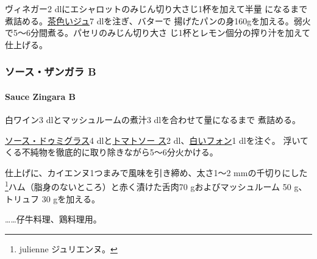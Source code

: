 ヴィネガー2\undemi{} dlにエシャロットのみじん切り大さじ1杯を加えて半量
になるまで煮詰める。\protect\hyperlink{jus-de-veau-lie}{茶色いジュ}7
dlを注ぎ、バターで
揚げたパンの身160gを加える。弱火で5〜6分間煮る。パセリのみじん切り大さ
じ1杯とレモン\undemi{}個分の搾り汁を加えて仕上げる。

\maeaki

\hypertarget{ux30bdux30fcux30b9ux30b6ux30f3ux30acux30e9-b}{%
\subsubsection{ソース・ザンガラ
B}\label{ux30bdux30fcux30b9ux30b6ux30f3ux30acux30e9-b}}

\hypertarget{sauce-zingara-b}{%
\paragraph{Sauce Zingara B}\label{sauce-zingara-b}}

白ワイン3 dlとマッシュルームの煮汁3 dlを合わせて\untiers{}量になるまで
煮詰める。

\protect\hyperlink{sauce-demi-glace}{ソース・ドゥミグラス}4
dlと\protect\hyperlink{sauce-tomate}{トマトソー ス}2\undemi{}
dl、\protect\hyperlink{fonds-blanc}{白いフォン}1 dlを注ぐ。
浮いてくる不純物を徹底的に取り除きながら5〜6分火かける。

仕上げに、カイエンヌ1つまみで風味を引き締め、太さ1〜2 mmの千切りにした
\footnote{julienne ジュリエンヌ。}ハム（脂身のないところ）と赤く漬けた舌肉70
gおよびマッシュルーム 50 g、トリュフ 30 gを加える。

\ldots{}\ldots{}仔牛料理、鶏料理用。
